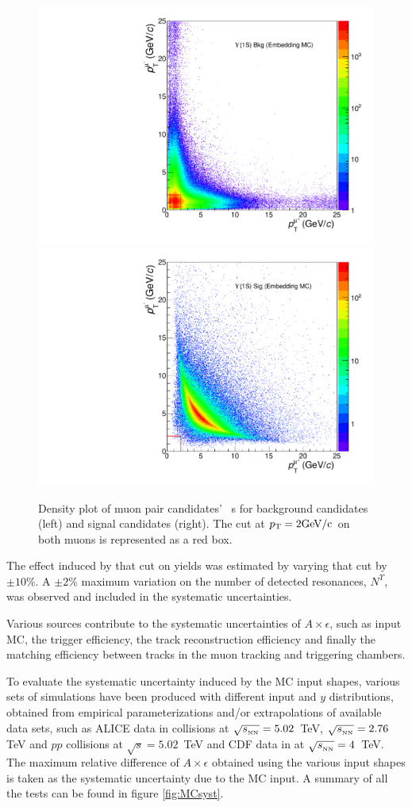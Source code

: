 \begin{figure}[!b]
\begin{center}
\includegraphics[width=0.45\linewidth]{Chapters/Analysis/Figs/background.pdf}
\includegraphics[width=0.45\linewidth]{Chapters/Analysis/Figs/signal.pdf}
\caption{Density plot of muon pair candidates' \pt~s for background candidates (left) and signal candidates (right). The cut at $p_{\rm{T}}=2 \rm{GeV}/c$ on both muons is represented as a red box.}
\label{fig:ptcut}
\end{center}
\end{figure}

The effect induced by that cut on \upsi yields was estimated by varying that cut by $\pm10$\%.
A $\pm2$\% maximum variation on the number of detected \upsi resonances, $N^{\Upsilon}$, was observed and included in the systematic uncertainties.

Various sources contribute to the systematic uncertainties of $A\times\epsilon$, such as input MC, the trigger efficiency, the track reconstruction efficiency and finally the matching efficiency between tracks in the muon tracking and triggering chambers. 

To evaluate the systematic uncertainty induced by the MC input shapes, various sets of simulations have been produced with different \upsi input \pt and $y$ distributions, obtained from empirical parameterizations and/or extrapolations of available data sets, such as ALICE data in \pbpb collisions at $\sqrt{s_{_{\rm NN}}}=5.02$~\rm{TeV}, $\sqrt{s_{_{\rm NN}}}=2.76$ \rm{TeV} and $pp$ collisions at $\sqrt{s}=5.02$~\rm{TeV} and CDF data in \pbpb at $\sqrt{s_{_{\rm NN}}}=4$~\rm{TeV}. 
The maximum relative difference of $A\times\epsilon$ obtained using the various input shapes is taken as the systematic uncertainty due to the MC input.
A summary of all the tests can be found in figure \ref{fig:MCsyst}.

